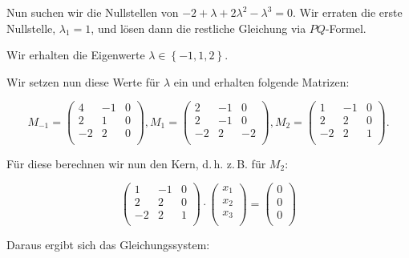 \documentclass{scrartcl}
\begin{document}
Nun suchen wir die Nullstellen von $-2 + \lambda +2\lambda^2 - \lambda^3 = 0$. Wir
erraten die erste Nullstelle, $\lambda_1 = 1$, und lösen dann die restliche Gleichung
via $PQ$-Formel.

Wir erhalten die Eigenwerte $\lambda \in \left\{-1, 1, 2\right\}$.

Wir setzen nun diese Werte für $\lambda$ ein und erhalten folgende Matrizen:

\begin{equation}
	M_{-1} = \begin{pmatrix*}
		4 & -1 & 0 \\
		2 & 1 & 0 \\
		-2 & 2 & 0 \\
	\end{pmatrix*},
	M_1 = \begin{pmatrix*}
		2 & -1 & 0 \\
		2 & -1 & 0 \\
		-2 & 2 & -2 \\
	\end{pmatrix*},
	M_2 = \begin{pmatrix*}
		1 & -1 & 0 \\
		2 & 2 & 0 \\
		-2 & 2 & 1 \\
	\end{pmatrix*}.
\end{equation}

Für diese berechnen wir nun den Kern, d.\,h. z.\,B. für $M_{2}$:

\begin{equation}
	\begin{pmatrix*}
		1 & -1 & 0 \\
		2 & 2 & 0 \\
		-2 & 2 & 1 \\
	\end{pmatrix*} \cdot \begin{pmatrix*}
	       x_1 \\
	       x_2 \\
	       x_3 \\
	\end{pmatrix*} = \begin{pmatrix*}
		0 \\
		0 \\
		0 \\
	\end{pmatrix*}
\end{equation}

Daraus ergibt sich das Gleichungssystem:
\end{document}
